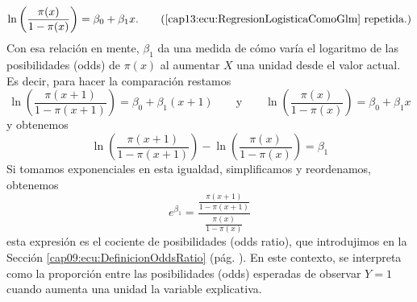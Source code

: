 \begin{equation*}
\ln\left(\dfrac{\pi(x)}{1-\pi(x)}\right)=\beta_0+\beta_1 x.
\tag{\ref{cap13:ecu:RegresionLogisticaComoGlm} repetida.}
\end{equation*}
Con esa relaci\'on en mente, $\beta_1$ da una medida de c\'omo var\'ia el logaritmo de
las posibilidades (odds) de $\pi(x)$ al aumentar $X$ una unidad desde el valor actual. Es decir,
para hacer la comparaci\'on restamos
	\[\ln\left(\dfrac{\pi(x+1)}{1-\pi(x+1)}\right)=\beta_0+\beta_1 (x+1)
	\qquad \text{y} 	\qquad \ln\left(\dfrac{\pi(x)}{1-\pi(x)}\right)=\beta_0+\beta_1 x \]
y obtenemos
	\[\ln\left(\dfrac{\pi(x+1)}{1-\pi(x+1)}\right)-\ln\left(\dfrac{\pi(x)}{1-\pi(x)}\right)=\beta_1 \]
Si tomamos exponenciales en esta igualdad, simplificamos y reordenamos, obtenemos
	\[e^{\beta_1}=\dfrac{\frac{\pi(x+1)}{1-\pi(x+1)}}{\frac{\pi(x)}{1-\pi(x)}}\]
esta expresi\'on es el cociente de posibilidades (odds ratio),
que introdujimos en la Secci\'on \ref{cap09:ecu:DefinicionOddsRatio}
(pág. \pageref{cap09:ecu:DefinicionOddsRatio}). En este contexto, se interpreta
como la proporci\'on entre las posibilidades (odds) esperadas de observar $Y=1$
cuando aumenta una unidad la variable explicativa. \newline


